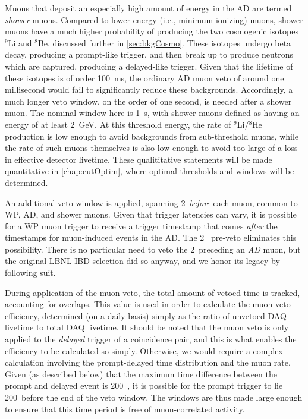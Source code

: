 \documentclass[../thesis.tex]{subfiles}
\begin{document}
Muons that deposit an especially high amount of energy in the AD are termed
\emph{shower} muons. Compared to lower-energy (i.e., minimum ionizing) muons,
shower muons have a much higher probability of producing the two cosmogenic
isotopes $^9$Li and $^8$Be, discussed further in \autoref{sec:bkgCosmo}. These
isotopes undergo beta decay, producing a prompt-like trigger, and then break up
to produce neutrons which are captured, producing a delayed-like trigger. Given
that the lifetime of these isotopes is of order 100~ms, the ordinary AD muon
veto of around one millisecond would fail to significantly reduce these
backgrounds. Accordingly, a much longer veto window, on the order of one second,
is needed after a shower muon. The nominal window here is 1~s, with shower muons
defined as having an energy of at least 2~GeV. At this threshold energy, the
rate of $^9$Li/$^8$He production is low enough to avoid backgrounds from
sub-threshold muons, while the rate of such muons themselves is also low enough
to avoid too large of a loss in effective detector livetime. These qualititative
statements will be made quantitative in \autoref{chap:cutOptim}, where optimal
thresholds and windows will be determined.

An additional veto window is applied, spanning 2~\us \emph{before} each muon,
common to WP, AD, and shower muons. Given that trigger latencies can vary, it is
possible for a WP muon trigger to receive a trigger timestamp that comes
\emph{after} the timestamps for muon-induced events in the AD. The 2~\us
pre-veto eliminates this possibility. There is no particular need to veto the
2~\us preceding an \emph{AD} muon, but the original LBNL IBD selection did so
anyway, and we honor its legacy by following suit.

During application of the muon veto, the total amount of vetoed time is tracked,
accounting for overlaps. This value is used in order to calculate the muon veto
efficiency, determined (on a daily basis) simply as the ratio of unvetoed DAQ
livetime to total DAQ livetime. It should be noted that the muon veto is only
applied to the \emph{delayed} trigger of a coincidence pair, and this is what
enables the efficiency to be calculated so simply. Otherwise, we would require a
complex calculation involving the prompt-delayed time distribution and the muon
rate. Given (as described below) that the maximum time difference between the
prompt and delayed event is 200~\us, it is possible for the prompt trigger to
lie 200~\us before the end of the veto window. The windows are thus made large
enough to ensure that this time period is free of muon-correlated activity.
\end{document}
